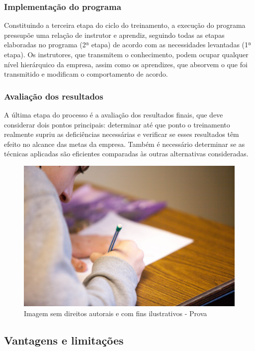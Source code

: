 \documentclass[12pt]{article}
\begin{document}
\subsubsection{Implementação do programa}

Constituindo a terceira etapa do ciclo do treinamento, a execução do programa pressupõe uma relação de instrutor e aprendiz, seguindo todas as etapas elaboradas no programa (2ª etapa) de acordo com as necessidades levantadas (1ª etapa). Os instrutores, que transmitem o conhecimento, podem ocupar qualquer nível hierárquico da empresa, assim como os aprendizes, que absorvem o que foi transmitido e modificam o comportamento de acordo.

\subsubsection{Avaliação dos resultados}

A última etapa do processo é a avaliação dos resultados finais, que deve considerar dois pontos principais: determinar até que ponto o treinamento realmente supriu as deficiências necessárias e verificar se esses resultados têm efeito no alcance das metas da empresa. Também é necessário determinar se as técnicas aplicadas são eficientes comparadas às outras alternativas consideradas.

\begin{figure}[h]
	\centering
	\includegraphics[width=1\textwidth]{build/images/prova}
	\caption{Imagem sem direitos autorais e com fins ilustrativos - Prova}
\end{figure}


\subsection{Vantagens e limitações}
\end{document}
